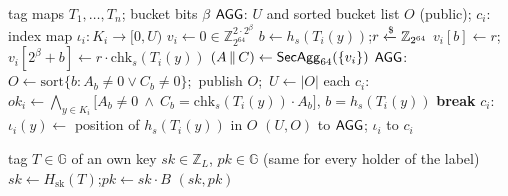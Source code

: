 \begin{algorithm}[t]
\caption{$\mathsf{BucketUnion}$: occupied buckets by one SecAgg}
\label{alg:bucket}
\begin{algorithmic}[1]
\Require tag maps $T_1,\dots,T_n$; bucket bits $\beta$
\Ensure $\mathsf{AGG}$: $U$ and sorted bucket list $O$ (public); $c_i$: index map $\iota_i:K_i\to[0,U)$
 
    \State $v_i\gets 0\in\mathbb{Z}_{2^{64}}^{2\cdot 2^\beta}$
      \State $b\gets h_s(T_i(y))$;\quad $r\xleftarrow{\$}\mathbb{Z}_{2^{64}}$
      \State $v_i[b]\gets r$;\quad $v_i[2^\beta+b]\gets r\cdot\mathrm{chk}_s(T_i(y))$
    \EndFor
  \EndFor
  \State $(A\,\|\,C)\gets\mathsf{SecAgg}_{64}(\{v_i\})$ 
  \State $\mathsf{AGG}$: $O\gets\mathrm{sort}\{b: A_b\neq 0\lor C_b\neq 0\}$;\ publish $O$;\ $U\gets|O|$
  \State each $c_i$: $\mathit{ok}_i\gets\bigwedge_{y\in K_i} \bigl[A_b\ne 0\ \land\ C_b=\mathrm{chk}_s(T_i(y))\cdot A_b\bigr]$, $b=h_s(T_i(y))$
   \textbf{break} 
  \EndIf
\EndFor
\State $c_i$: $\iota_i(y)\gets$ position of $h_s(T_i(y))$ in $O$
\State \Return $(U,O)$ to $\mathsf{AGG}$; $\iota_i$ to $c_i$
\end{algorithmic}
\end{algorithm}

\begin{algorithm}[t]
\caption{$\mathsf{SlotKey}$: KEM key pair of an index, run by each holder}
\label{alg:slotkey}
\begin{algorithmic}[1]
\Require tag $T\in\mathbb{G}$ of an own key
\Ensure $sk\in\mathbb{Z}_L$, $pk\in\mathbb{G}$ (same for every holder of the label)
\State $sk\gets H_{\mathrm{sk}}(T)$;\quad $pk\gets sk\cdot B$
\State \Return $(sk,pk)$
\end{algorithmic}
\end{algorithm}

